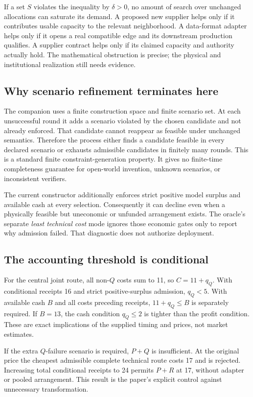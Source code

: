 \documentclass[11pt,a4paper]{article}
\begin{document}
If a set $S$ violates the inequality by $\delta>0$, no amount of search over unchanged allocations can saturate its demand. A proposed new supplier helps only if it contributes usable capacity to the relevant neighborhood. A data-format adapter helps only if it opens a real compatible edge and its downstream production qualifies. A supplier contract helps only if its claimed capacity and authority actually hold. The mathematical obstruction is precise; the physical and institutional realization still needs evidence.

\subsection{Why scenario refinement terminates here}
The companion uses a finite construction space and finite scenario set. At each unsuccessful round it adds a scenario violated by the chosen candidate and not already enforced. That candidate cannot reappear as feasible under unchanged semantics. Therefore the process either finds a candidate feasible in every declared scenario or exhausts admissible candidates in finitely many rounds. This is a standard finite constraint-generation property. It gives no finite-time completeness guarantee for open-world invention, unknown scenarios, or inconsistent verifiers.

The current constructor additionally enforces strict positive model surplus and available cash at every selection. Consequently it can decline even when a physically feasible but uneconomic or unfunded arrangement exists. The oracle's separate \emph{least technical cost} mode ignores those economic gates only to report why admission failed. That diagnostic does not authorize deployment.

\subsection{The accounting threshold is conditional}
For the central joint route, all non-$Q$ costs sum to 11, so $C=11+q_Q$. With conditional receipts 16 and strict positive-surplus admission, $q_Q<5$. With available cash $B$ and all costs preceding receipts, $11+q_Q\le B$ is separately required. If $B=13$, the cash condition $q_Q\le2$ is tighter than the profit condition. These are exact implications of the supplied timing and prices, not market estimates.

If the extra $Q$-failure scenario is required, $P+Q$ is insufficient. At the original price the cheapest admissible complete technical route costs 17 and is rejected. Increasing total conditional receipts to 24 permits $P+R$ at 17, without adapter or pooled arrangement. This result is the paper's explicit control against unnecessary transformation.
\end{document}
